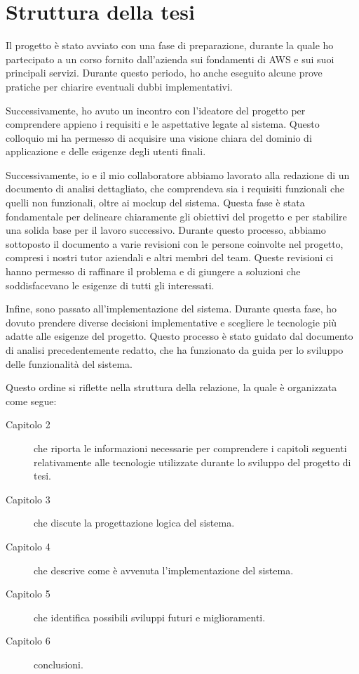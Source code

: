 \section{Struttura della tesi}

Il progetto è stato avviato con una fase di preparazione, durante la quale ho partecipato a un corso fornito dall'azienda sui fondamenti di AWS e sui suoi principali servizi. Durante questo periodo, ho anche eseguito alcune prove pratiche per chiarire eventuali dubbi implementativi.

Successivamente, ho avuto un incontro con l'ideatore del progetto per comprendere appieno i requisiti e le aspettative legate al sistema. Questo colloquio mi ha permesso di acquisire una visione chiara del dominio di applicazione e delle esigenze degli utenti finali. 

Successivamente, io e il mio collaboratore abbiamo lavorato alla redazione di un documento di analisi dettagliato, che comprendeva sia i requisiti funzionali che quelli non funzionali, oltre ai mockup del sistema. Questa fase è stata fondamentale per delineare chiaramente gli obiettivi del progetto e per stabilire una solida base per il lavoro successivo. Durante questo processo, abbiamo sottoposto il documento a varie revisioni con le persone coinvolte nel progetto, compresi i nostri tutor aziendali e altri membri del team. Queste revisioni ci hanno permesso di raffinare il problema e di giungere a soluzioni che soddisfacevano le esigenze di tutti gli interessati.

Infine, sono passato all'implementazione del sistema. Durante questa fase, ho dovuto prendere diverse decisioni implementative e scegliere le tecnologie più adatte alle esigenze del progetto. Questo processo è stato guidato dal documento di analisi precedentemente redatto, che ha funzionato da guida per lo sviluppo delle funzionalità del sistema.

Questo ordine si riflette nella struttura della relazione, la quale è organizzata come segue:
\begin{description}
    \item[Capitolo 2] che riporta le informazioni necessarie per comprendere i capitoli seguenti relativamente alle tecnologie utilizzate durante lo sviluppo del progetto di tesi.
    \item[Capitolo 3] che discute la progettazione logica del sistema.
    \item[Capitolo 4] che descrive come è avvenuta l'implementazione del sistema.
    \item[Capitolo 5] che identifica possibili sviluppi futuri e miglioramenti. 
    \item[Capitolo 6] conclusioni.
\end{description}

